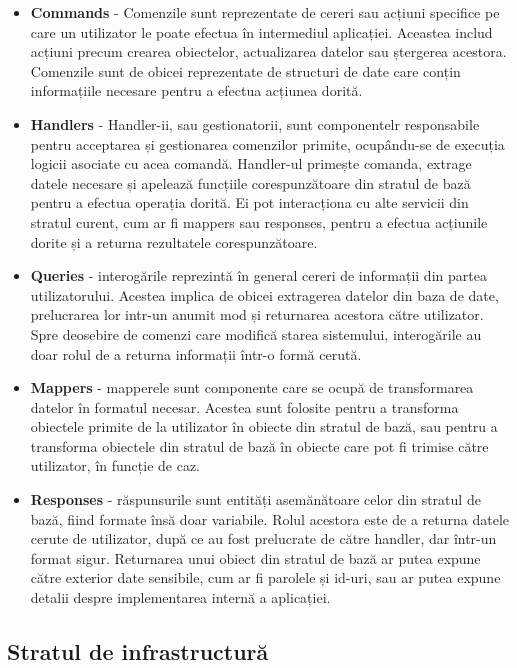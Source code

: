 \begin{itemize}
    \item \textbf{Commands} - Comenzile sunt reprezentate de cereri sau acțiuni specifice pe care un utilizator le poate efectua în intermediul aplicației. Aceastea includ acțiuni precum crearea obiectelor, actualizarea datelor sau ștergerea acestora. Comenzile sunt de obicei reprezentate de structuri de date care conțin informațiile necesare pentru a efectua acțiunea dorită.
    \item \textbf{Handlers} - Handler-ii, sau gestionatorii, sunt componentelr responsabile pentru acceptarea și gestionarea comenzilor primite, ocupându-se de execuția logicii asociate cu acea comandă. Handler-ul primește comanda, extrage datele necesare și apelează funcțiile corespunzătoare din stratul de bază pentru a efectua operația dorită. Ei pot interacționa cu alte servicii din stratul curent, cum ar fi mappers sau responses, pentru a efectua acțiunile dorite și a returna rezultatele corespunzătoare.
    \item \textbf{Queries} - interogările reprezintă în general cereri de informații din partea utilizatorului. Acestea implica de obicei extragerea datelor din baza de date, prelucrarea lor intr-un anumit mod și returnarea acestora către utilizator. Spre deosebire de comenzi care modifică starea sistemului, interogările au doar rolul de a returna informații într-o formă cerută.
    \item \textbf{Mappers} - mapperele sunt componente care se ocupă de transformarea datelor în formatul necesar. Acestea sunt folosite pentru a transforma obiectele primite de la utilizator în obiecte din stratul de bază, sau pentru a transforma obiectele din stratul de bază în obiecte care pot fi trimise către utilizator, în funcție de caz.
    
    \newpage

    \item \textbf{Responses} - răspunsurile sunt entități asemănătoare celor din stratul de bază, fiind formate însă doar variabile. Rolul acestora este de a returna datele cerute de utilizator, după ce au fost prelucrate de către handler, dar într-un format sigur. Returnarea unui obiect din stratul de bază ar putea expune către exterior date sensibile, cum ar fi parolele și id-uri, sau ar putea expune detalii despre implementarea internă a aplicației.
\end{itemize}

\subsection{Stratul de infrastructură}

